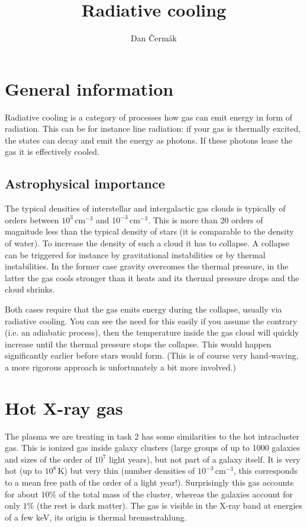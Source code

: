 \documentclass[a4paper,10pt,openany]{article}
\title{Radiative cooling}
\author{Dan Čermák}
\begin{document}
\maketitle

\section{General information}

Radiative cooling is a category of processes how gas can emit energy in form of radiation. This can be for instance line radiation: if your gas is thermally excited, the states can decay and emit the energy as photons. If these photons lease the gas it is effectively cooled.


\subsection{Astrophysical importance}

The typical densities of interstellar and intergalactic gas clouds is typically of orders between $10^3\,\mathrm{cm}^{-3}$ and $10^{-3}\,\mathrm{cm}^{-3}$. This is more than 20 orders of magnitude less than the typical density of stars (it is comparable to the density of water). To increase the density of such a cloud it has to collapse. A collapse can be triggered for instance by gravitational instabilities or by thermal instabilities. In the former case gravity overcomes the thermal pressure, in the latter the gas cools stronger than it heats and its thermal pressure drops and the cloud shrinks.

Both cases require that the gas emits energy during the collapse, usually via radiative cooling. You can see the need for this easily if you assume the contrary (i.e. an adiabatic process), then the temperature inside the gas cloud will quickly increase until the thermal pressure stops the collapse. This would happen significantly earlier before stars would form. (This is of course very hand-waving, a more rigorous approach is unfortunately a bit more involved.)


\section{Hot X-ray gas}

The plasma we are treating in task 2 has some similarities to the hot intracluster gas. This is ionized gas inside galaxy clusters (large groups of up to 1000 galaxies and sizes of the order of $10^7$ light years), but not part of a galaxy itself. It is very hot (up to $10^8\,\mathrm{K}$) but very thin (number densities of $10^{-3} \,\mathrm{cm}^{-3}$, this corresponds to a mean free path of the order of a light year!). Surprisingly this gas accounts for about $10\%$ of the total mass of the cluster, whereas the galaxies account for only $1\%$ (the rest is dark matter). The gas is visible in the X-ray band at energies of a few keV, its origin is thermal bremsstrahlung.
\end{document}
